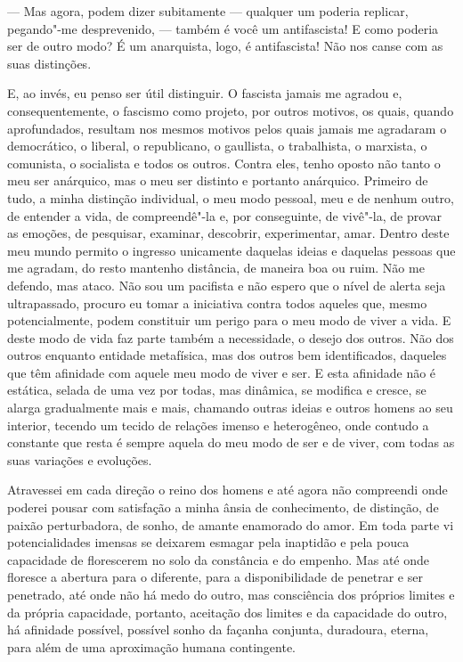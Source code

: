 --- Mas agora, podem dizer subitamente --- qualquer um poderia replicar,
pegando"-me desprevenido, --- também é você um antifascista! E como
poderia ser de outro modo? É um anarquista, logo, é antifascista! Não
nos canse com as suas distinções.

E, ao invés, eu penso ser útil distinguir. O fascista jamais me agradou
e, consequentemente, o fascismo como projeto, por outros motivos, os
quais, quando aprofundados, resultam nos mesmos motivos pelos quais
jamais me agradaram o democrático, o liberal, o republicano, o
gaullista, o trabalhista, o marxista, o comunista, o socialista e todos
os outros. Contra eles, tenho oposto não tanto o meu ser anárquico, mas
o meu ser distinto e portanto anárquico. Primeiro de tudo, a minha
distinção individual, o meu modo pessoal, meu e de nenhum outro, de
entender a vida, de compreendê"-la e, por conseguinte, de vivê"-la, de
provar as emoções, de pesquisar, examinar, descobrir, experimentar,
amar. Dentro deste meu mundo permito o ingresso unicamente daquelas
ideias e daquelas pessoas que me agradam, do resto mantenho distância,
de maneira boa ou ruim. Não me defendo, mas ataco. Não sou um pacifista
e não espero que o nível de alerta seja ultrapassado, procuro eu tomar a
iniciativa contra todos aqueles que, mesmo potencialmente, podem
constituir um perigo para o meu modo de viver a vida. E deste modo de
vida faz parte também a necessidade, o desejo dos outros. Não dos outros
enquanto entidade metafísica, mas dos outros bem identificados, daqueles
que têm afinidade com aquele meu modo de viver e ser. E esta afinidade
não é estática, selada de uma vez por todas, mas dinâmica, se modifica e
cresce, se alarga gradualmente mais e mais, chamando outras ideias e
outros homens ao seu interior, tecendo um tecido de relações imenso e
heterogêneo, onde contudo a constante que resta é sempre aquela do meu
modo de ser e de viver, com todas as suas variações e evoluções.

Atravessei em cada direção o reino dos homens e até agora não compreendi
onde poderei pousar com satisfação a minha ânsia de conhecimento, de
distinção, de paixão perturbadora, de sonho, de amante enamorado do
amor. Em toda parte vi potencialidades imensas se deixarem esmagar pela
inaptidão e pela pouca capacidade de florescerem no solo da constância e
do empenho. Mas até onde floresce a abertura para o diferente, para a
disponibilidade de penetrar e ser penetrado, até onde não há medo do
outro, mas consciência dos próprios limites e da própria capacidade,
portanto, aceitação dos limites e da capacidade do outro, há afinidade
possível, possível sonho da façanha conjunta, duradoura, eterna, para
além de uma aproximação humana contingente.

